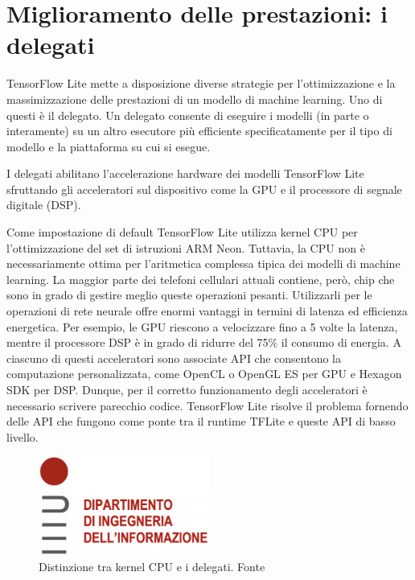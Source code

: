 \section{Miglioramento delle prestazioni: i delegati}
TensorFlow Lite mette a disposizione diverse strategie per l’ottimizzazione e la massimizzazione delle prestazioni di un modello di machine learning.
Uno di questi è il delegato. Un delegato consente di eseguire i modelli (in parte o interamente) su un altro esecutore più efficiente specificatamente
per il tipo di modello e la piattaforma su cui si esegue.                                                                                                                                       

I delegati abilitano l'accelerazione hardware dei modelli TensorFlow Lite sfruttando gli acceleratori sul dispositivo come la GPU e il processore di
segnale digitale (DSP).

Come impostazione di default TensorFlow Lite utilizza kernel CPU per l’ottimizzazione del set di istruzioni ARM Neon. Tuttavia, la CPU non è
necessariamente ottima per l'aritmetica complessa tipica dei modelli di machine learning. La maggior parte dei telefoni cellulari attuali contiene,
però, chip che sono in grado di gestire meglio queste operazioni pesanti. Utilizzarli per le operazioni di rete neurale offre enormi vantaggi in termini
di latenza ed efficienza energetica. Per esempio, le GPU riescono a velocizzare fino a 5 volte la latenza, mentre il processore DSP è in grado di ridurre
del 75\% il consumo di energia. A ciascuno di questi acceleratori sono associate API che consentono la computazione personalizzata, come OpenCL o OpenGL
ES per GPU e Hexagon SDK per DSP. Dunque, per il corretto funzionamento degli acceleratori è necessario scrivere parecchio codice. TensorFlow Lite risolve
il problema fornendo delle API che fungono come ponte tra il runtime TFLite e queste API di basso livello.

\begin{figure}
    \centering
    \includegraphics[width=0.5\textwidth]{Immagini/logo_dei.png}
    \caption{Distinzione tra kernel CPU e i delegati. Fonte}
    \label{fig:distinzione}
\end{figure}

